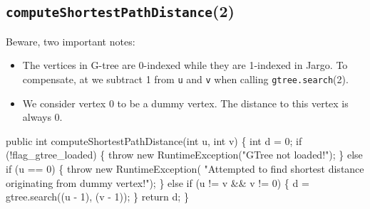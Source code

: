\documentclass{article}
\def\nwendcode{\endtrivlist \endgroup}      %
\let\nwdocspar=\par
\begin{document}
\subsection{{\tt{}\protect{}computeShortestPathDistance}(2)}
Beware, two important notes:
\begin{itemize}
\item The vertices in G-tree are 0-indexed while they are 1-indexed in Jargo.
To compensate, at we subtract 1 from {\tt{}u} and {\tt{}v} when calling
{\tt{}\protect{}gtree.search}(2).
\item We consider vertex 0 to be a dummy vertex. The distance to this vertex
is always 0.
\end{itemize}
\nwenddocs{}\endmoddef{}
public int computeShortestPathDistance(int u, int v) \{
  int d = 0;
  if (!flag_gtree_loaded) \{
    throw new RuntimeException("GTree not loaded!");
  \} else if (u == 0) \{
    throw new RuntimeException(
        "Attempted to find shortest distance originating from dummy vertex!");
  \} else if (u != v && v != 0) \{
    d = gtree.search((u - 1), (v - 1));
  \}
  return d;
\}
\eatline
{}\nwendcode{}\nwdocspar
\end{document}
